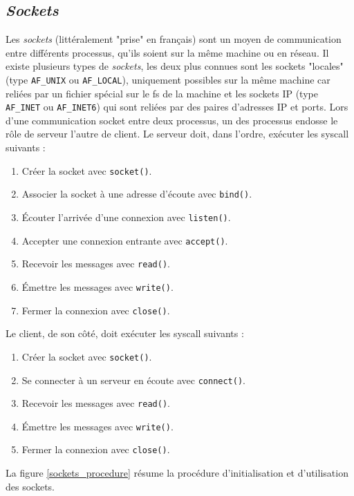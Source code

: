 \subsection{\textit{Sockets}}\label{sockets_doc}
Les \textit{sockets} (littéralement "prise" en français) sont un moyen de communication entre 
différents processus, qu'ils soient sur la même machine ou en réseau. Il existe plusieurs types 
de \textit{sockets}, les deux plus connues sont les sockets "locales" (type \texttt{AF_UNIX} ou 
\texttt{AF_LOCAL}), uniquement possibles sur la même machine car reliées par un fichier spécial 
sur le \acrshort{fs} de la machine et les sockets IP (type \texttt{AF_INET} ou 
\texttt{AF_INET6}) qui sont reliées par des paires d'adresses IP et ports.
Lors d'une communication socket entre deux processus, un des processus endosse le rôle de serveur 
l'autre de client. Le serveur doit, dans l'ordre, exécuter les \acrshort{syscall} suivants : 
\begin{enumerate}
    \item Créer la socket avec \texttt{socket()}.
    \item Associer la socket à une adresse d'écoute avec \texttt{bind()}.
    \item Écouter l'arrivée d'une connexion avec \texttt{listen()}.
    \item Accepter une connexion entrante avec \texttt{accept()}.
    \item Recevoir les messages avec \texttt{read()}.
    \item Émettre les messages avec \texttt{write()}.
    \item Fermer la connexion avec \texttt{close()}.
\end{enumerate}
Le client, de son côté, doit exécuter les \acrshort{syscall} suivants :
\begin{enumerate}
    \item Créer la socket avec \texttt{socket()}.
    \item Se connecter à un serveur en écoute avec \texttt{connect()}.
    \item Recevoir les messages avec \texttt{read()}.
    \item Émettre les messages avec \texttt{write()}.
    \item Fermer la connexion avec \texttt{close()}.
\end{enumerate}
La figure \ref{sockets_procedure} résume la procédure d'initialisation et d'utilisation des sockets.
